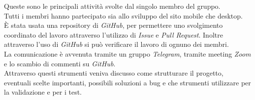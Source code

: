 Queste sono le principali attività svolte dal singolo membro del gruppo.\\
Tutti i membri hanno partecipato sia allo sviluppo del sito mobile che desktop.\\
È stata usata una repository di \emph{GitHub}, per permettere uno svolgimento coordinato del lavoro attraverso l'utilizzo di \emph{Issue} e \emph{Pull Request}. Inoltre attraverso l'uso di \emph{GitHub} si può verificare il lavoro di ognuno dei membri.\\
La comunicazione è avvenuta tramite un gruppo \emph{Telegram}, tramite meeting \emph{Zoom} e lo scambio di commenti su \emph{GitHub}.\\
Attraverso questi strumenti veniva discusso come strutturare il progetto, eventuali scelte importanti, possibili soluzioni a bug e che strumenti utilizzare per la validazione e per i test.